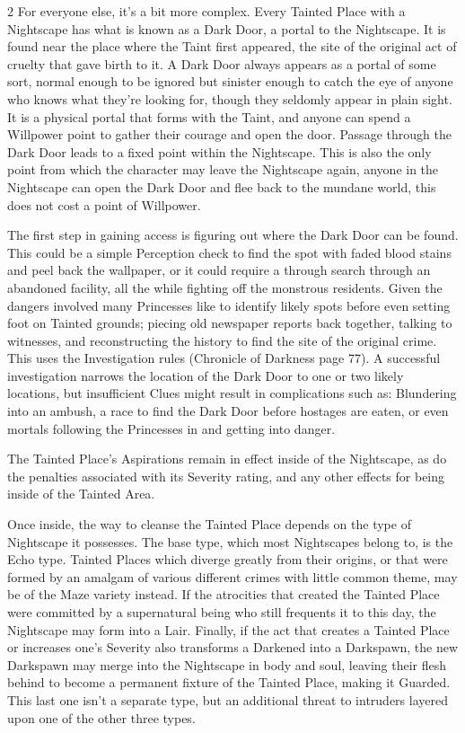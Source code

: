 \begin{multicols}{2}
For everyone else, it’s a bit more complex. Every Tainted Place with a Nightscape has what is known as a Dark Door, a portal to the Nightscape. It is found near the place where the Taint first appeared, the site of the original act of cruelty that gave birth to it. A Dark Door always appears as a portal of some sort, normal enough to be ignored but sinister enough to catch the eye of anyone who knows what they’re looking for, though they seldomly appear in plain sight. It is a physical portal that forms with the Taint, and anyone can spend a Willpower point to gather their courage and open the door. Passage through the Dark Door leads to a fixed point within the Nightscape. This is also the only point from which the character may leave the Nightscape again, anyone in the Nightscape can open the Dark Door and flee back to the mundane world, this does not cost a point of Willpower.

The first step in gaining access is figuring out where the Dark Door can be found. This could be a simple Perception check to find the spot with faded blood stains and peel back the wallpaper, or it could require a through search through an abandoned facility, all the while fighting off the monstrous residents. Given the dangers involved many Princesses like to identify likely spots before even setting foot on Tainted grounds; piecing old newspaper reports back together, talking to witnesses, and reconstructing the history to find the site of the original crime. This uses the Investigation rules (Chronicle of Darkness page 77). A successful investigation narrows the location of the Dark Door to one or two likely locations, but insufficient Clues might result in complications such as: Blundering into an ambush, a race to find the Dark Door before hostages are eaten, or even mortals following the Princesses in and getting into danger.

The Tainted Place’s Aspirations remain in effect inside of the Nightscape, as do the penalties associated with its Severity rating, and any other effects for being inside of the Tainted Area.

Once inside, the way to cleanse the Tainted Place depends on the type of Nightscape it possesses. The base type, which most Nightscapes belong to, is the Echo type. Tainted Places which diverge greatly from their origins, or that were formed by an amalgam of various different crimes with little common theme, may be of the Maze variety instead. If the atrocities that created the Tainted Place were committed by a supernatural being who still frequents it to this day, the Nightscape may form into a  Lair. Finally, if the act that creates a Tainted Place or increases one’s Severity also transforms a Darkened into a Darkspawn, the new Darkspawn may merge into the Nightscape in body and soul, leaving their flesh behind to become a permanent fixture of the Tainted Place, making it Guarded. This last one isn’t a separate type, but an additional threat to intruders layered upon one of the other three types.


\end{multicols}
